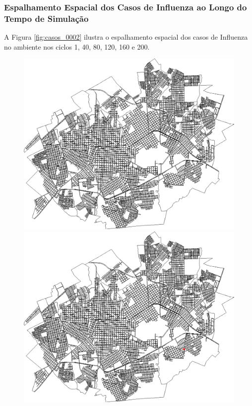 \newpage

\subsubsection{Espalhamento Espacial dos Casos de Influenza ao Longo do Tempo de Simulação}

A Figura \ref{fig:casos_0002} ilustra o espalhamento espacial dos casos de Influenza no ambiente nos ciclos 1, 40, 80, 120, 160 e 200.

\begin{figure}[H]
  \centering
  \begin{minipage}{.5\textwidth}
    \centering
    \includegraphics[width=1.0\textwidth]{Figuras/Resultados/0002/Saidas_GPU_BIT/MonteCarlo_0/Simulacao_0/Casos/00000.png}
    \captionsetup{labelformat=empty}
  \end{minipage}%
  \begin{minipage}{.5\textwidth}
    \centering
    \includegraphics[width=1.0\textwidth]{Figuras/Resultados/0002/Saidas_GPU_BIT/MonteCarlo_0/Simulacao_0/Casos/00040.png}

\end{minipage}
\end{figure}
